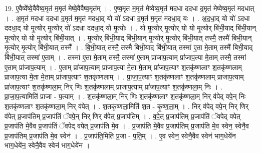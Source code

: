 \documentclass[17pt]{extarticle}
\begin{document}
19. ए॒वैष्वे᳚ष्वे॒वैवैष्व॒मृत॑ म॒मृत॑ मेष्वे॒वैवैष्व॒मृत᳚म् । . ए॒ष्व॒मृत॑ म॒मृत॑ मेष्वेष्व॒मृत॑ मदधा ददधा द॒मृत॑ मेष्वेष्व॒मृत॑ मदधात् । . अ॒मृत॑ मदधा ददधा द॒मृत॑ म॒मृत॑ मदधा॒द् यो यो॑ ऽदधा द॒मृत॑ म॒मृत॑ मदधा॒द् यः । . अ॒द॒धा॒द् यो यो॑ ऽदधा ददधा॒द् यो मृ॒त्योर् मृ॒त्योर् यो॑ ऽदधा ददधा॒द् यो मृ॒त्योः । . यो मृ॒त्योर् मृ॒त्योर् यो यो मृ॒त्योर् बि॑भी॒याद् बि॑भी॒यान् मृ॒त्योर् यो यो मृ॒त्योर् बि॑भी॒यात् । . मृ॒त्योर् बि॑भी॒याद् बि॑भी॒यान् मृ॒त्योर् मृ॒त्योर् बि॑भी॒यात् तस्मै॒ तस्मै॑ बिभी॒यान् मृ॒त्योर् मृ॒त्योर् बि॑भी॒यात् तस्मै᳚ । . बि॒भी॒यात् तस्मै॒ तस्मै॑ बिभी॒याद् बि॑भी॒यात् तस्मा॑ ए॒ता मे॒ताम् तस्मै॑ बिभी॒याद् बि॑भी॒यात् तस्मा॑ ए॒ताम् । . तस्मा॑ ए॒ता मे॒ताम् तस्मै॒ तस्मा॑ ए॒ताम् प्रा॑जाप॒त्याम् प्रा॑जाप॒त्या मे॒ताम् तस्मै॒ तस्मा॑ ए॒ताम् प्रा॑जाप॒त्याम् । . ए॒ताम् प्रा॑जाप॒त्याम् प्रा॑जाप॒त्या मे॒ता मे॒ताम् प्रा॑जाप॒त्याꣳ श॒तकृ॑ष्णलाꣳ श॒तकृ॑ष्णलाम् प्राजाप॒त्या मे॒ता मे॒ताम् प्रा॑जाप॒त्याꣳ श॒तकृ॑ष्णलाम् । . प्रा॒जा॒प॒त्याꣳ श॒तकृ॑ष्णलाꣳ श॒तकृ॑ष्णलाम् प्राजाप॒त्याम् प्रा॑जाप॒त्याꣳ श॒तकृ॑ष्णला॒म् निर् णिः श॒तकृ॑ष्णलाम् प्राजाप॒त्याम् प्रा॑जाप॒त्याꣳ श॒तकृ॑ष्णला॒म् निः । . प्रा॒जा॒प॒त्यामिति॑ प्राजा - प॒त्याम् । . श॒तकृ॑ष्णला॒म् निर् णिः श॒तकृ॑ष्णलाꣳ श॒तकृ॑ष्णला॒म् निर् व॑पेद् वपे॒न् निः श॒तकृ॑ष्णलाꣳ श॒तकृ॑ष्णला॒म् निर् व॑पेत् । . श॒तकृ॑ष्णला॒मिति॑ श॒त - कृ॒ष्ण॒ला॒म् । . निर् व॑पेद् वपे॒न् निर् णिर् व॑पेत् प्र॒जाप॑तिम् प्र॒जाप॑तिं ॅवपे॒न् निर् णिर् व॑पेत् प्र॒जाप॑तिम् । . व॒पे॒त् प्र॒जाप॑तिम् प्र॒जाप॑तिं ॅवपेद् वपेत् प्र॒जाप॑ति मे॒वैव प्र॒जाप॑तिं ॅवपेद् वपेत् प्र॒जाप॑ति मे॒व । . प्र॒जाप॑ति मे॒वैव प्र॒जाप॑तिम् प्र॒जाप॑ति मे॒व स्वेन॒ स्वेनै॒व प्र॒जाप॑तिम् प्र॒जाप॑ति मे॒व स्वेन॑ । . प्र॒जाप॑ति॒मिति॑ प्र॒जा - प॒ति॒म् । . ए॒व स्वेन॒ स्वेनै॒वैव स्वेन॑ भाग॒धेये॑न भाग॒धेये॑न॒ स्वेनै॒वैव स्वेन॑ भाग॒धेये॑न । \newline
\end{document}
